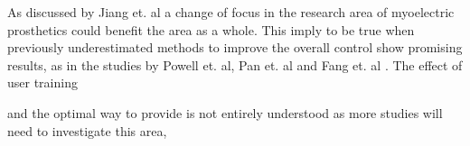 As discussed by Jiang et. al \cite{Jiang2012} a change of focus in the research area of myoelectric prosthetics could benefit the area as a whole. This imply to be true when previously underestimated methods to improve the overall control show promising results, as in the studies by Powell et. al, Pan et. al and Fang et. al \cite{Powell2014, Pan2017, Fang2017}. The effect of user training 
 
 
 and the optimal way to provide is not entirely understood as more studies will need to investigate this area,
 
 
% 
%
%
%
%
%
%
